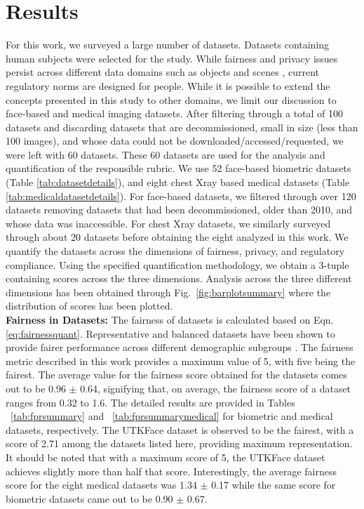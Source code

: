 \documentclass[journal]{IEEEtran}
\begin{document}
\section{Results}
For this work, we surveyed a large number of datasets. Datasets containing human subjects were selected for the study. While fairness and privacy issues persist across different data domains such as objects and scenes \cite{rojasdollar,deng2009imagenet}, current regulatory norms are designed for people. While it is possible to extend the concepts presented in this study to other domains, we limit our discussion to face-based and medical imaging datasets.  After filtering through a total of 100 datasets and discarding datasets that are decommissioned, small in size (less than 100 images), and whose data could not be downloaded/accessed/requested, we were left with 60 datasets. These 60 datasets are used for the analysis and quantification of the responsible rubric. We use 52 face-based biometric datasets (Table \ref{tab:datasetdetails}), and eight chest Xray based medical datasets (Table \ref{tab:medicaldatasetdetails}). For face-based datasets, we filtered through over 120 datasets removing datasets that had been decommissioned, older than 2010, and whose data was inaccessible. For chest Xray datasets, we similarly surveyed through about 20 datasets before obtaining the eight analyzed in this work. We quantify the datasets across the dimensions of fairness, privacy, and regulatory compliance. Using the specified quantification methodology, we obtain a 3-tuple containing scores across the three dimensions. Analysis across the three different dimensions has been obtained through Fig.~\ref{fig:barplotsummary} where the distribution of scores has been plotted.\\

\noindent \textbf{Fairness in Datasets:} The fairness of datasets is calculated based on Eqn. \ref{eq:fairnessquant}. Representative and balanced datasets have been shown to provide fairer performance across different demographic subgroups \cite{wang2021meta}. The fairness metric described in this work provides a maximum value of 5, with five being the fairest. The average value for the fairness score obtained for the datasets comes out to be 0.96 $\pm$ 0.64, signifying that, on average, the fairness score of a dataset ranges from 0.32 to 1.6. The detailed results are provided in Tables ~\ref{tab:fprsummary} and ~\ref{tab:fprsummarymedical} for biometric and medical datasets, respectively. The UTKFace dataset is observed to be the fairest, with a score of 2.71 among the datasets listed here, providing maximum representation. It should be noted that with a maximum score of 5, the UTKFace dataset achieves slightly more than half that score. Interestingly, the average fairness score for the eight medical datasets was 1.34 $\pm$ 0.17 while the same score for biometric datasets came out to be 0.90 $\pm$ 0.67.\\
\end{document}
